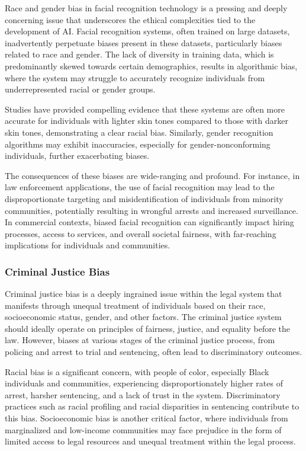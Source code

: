 \documentclass[12pt,a4paper,openright,twoside]{book}
\begin{document}
Race and gender bias in facial recognition technology is a pressing and deeply concerning issue that underscores the ethical complexities tied to the development of AI. Facial recognition systems, often trained on large datasets, inadvertently perpetuate biases present in these datasets, particularly biases related to race and gender. The lack of diversity in training data, which is predominantly skewed towards certain demographics, results in algorithmic bias, where the system may struggle to accurately recognize individuals from underrepresented racial or gender groups. \cite{https://doi.org/10.5281/zenodo.4050457}

Studies have provided compelling evidence that these systems are often more accurate for individuals with lighter skin tones compared to those with darker skin tones, demonstrating a clear racial bias. Similarly, gender recognition algorithms may exhibit inaccuracies, especially for gender-nonconforming individuals, further exacerbating biases. 

The consequences of these biases are wide-ranging and profound. For instance, in law enforcement applications, the use of facial recognition may lead to the disproportionate targeting and misidentification of individuals from minority communities, potentially resulting in wrongful arrests and increased surveillance. In commercial contexts, biased facial recognition can significantly impact hiring processes, access to services, and overall societal fairness, with far-reaching implications for individuals and communities.


\subsubsection{Criminal Justice Bias}

Criminal justice bias is a deeply ingrained issue within the legal system that manifests through unequal treatment of individuals based on their race, socioeconomic status, gender, and other factors. The criminal justice system should ideally operate on principles of fairness, justice, and equality before the law. However, biases at various stages of the criminal justice process, from policing and arrest to trial and sentencing, often lead to discriminatory outcomes. \cite{doi:10.1080/10345329.2019.1658694} 

Racial bias is a significant concern, with people of color, especially Black individuals and communities, experiencing disproportionately higher rates of arrest, harsher sentencing, and a lack of trust in the system. Discriminatory practices such as racial profiling and racial disparities in sentencing contribute to this bias. Socioeconomic bias is another critical factor, where individuals from marginalized and low-income communities may face prejudice in the form of limited access to legal resources and unequal treatment within the legal process. \cite{9660177}  
\end{document}
